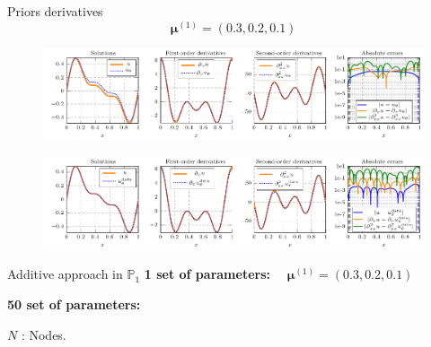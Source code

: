 \begin{appendixframe}{Priors derivatives}
	\vspace{-10pt}
	$$\bm{\mu}^{(1)}=(0.3,0.2,0.1)$$
	\begin{figure}[ht!]
		\centering
		\includegraphics[width=\linewidth]{images/appendix/datavspinns/standalone_solutions_and_errors_PINN.pdf}
	\end{figure}
	
	\begin{figure}[ht!]
		\centering
		\includegraphics[width=\linewidth]{images/appendix/datavspinns/standalone_solutions_and_errors_NN.pdf}
	\end{figure}
\end{appendixframe}

\begin{appendixframe}{Additive approach in $\mathbb{P}_1$}
	\vspace{-2pt}
	\textbf{1 set of parameters:} $\quad \bm{\mu}^{(1)}=(0.3,0.2,0.1)$
	
	\begin{table}[H]
		\centering
	\end{table}

	\vspace{6pt}
	\textbf{50 set of parameters:}

	\begin{table}[H]
		\centering
	\end{table}

	\footnotesize
	$N$ : Nodes.
\end{appendixframe}


